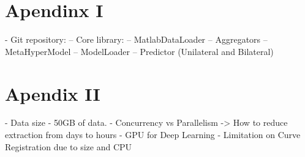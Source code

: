 \chapter{Apendinx I}
- Git repository:
    -- Core library:
        -- MatlabDataLoader
        -- Aggregators
        -- MetaHyperModel
        -- ModelLoader
        -- Predictor (Unilateral and Bilateral)



\chapter{Apendix II}
- Data size - 50GB of data.
- Concurrency vs Parallelism -> How to reduce extraction from days to hours
- GPU for Deep Learning
- Limitation on Curve Registration due to size and CPU 

    



